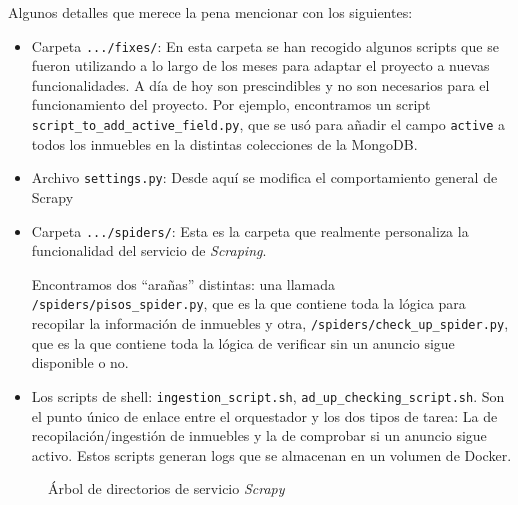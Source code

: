 Algunos detalles que merece la pena mencionar con los siguientes:

\begin{itemize}
    \item Carpeta \texttt{.../fixes/}: En esta carpeta se han recogido algunos scripts que se fueron utilizando a lo largo de los meses para adaptar el proyecto a nuevas funcionalidades. A día de hoy son prescindibles y no son necesarios para el funcionamiento del proyecto. Por ejemplo, encontramos un script \texttt{script\_to\_add\_active\_field.py}, que se usó para añadir el campo \texttt{active} a todos los inmuebles en la distintas colecciones de la MongoDB.
    \item Archivo \texttt{settings.py}: Desde aquí se modifica el comportamiento general de Scrapy
    \item Carpeta \texttt{.../spiders/}: Esta es la carpeta que realmente personaliza la funcionalidad del servicio de \textit{Scraping}. 
    
    Encontramos dos ``arañas'' distintas: una llamada \texttt{/spiders/pisos\_spider.py}, que es la que contiene toda la lógica para recopilar la información de inmuebles y otra,  \texttt{/spiders/check\_up\_spider.py}, que es la que contiene toda la lógica de verificar sin un anuncio sigue disponible o no.
    \item Los scripts de shell: \texttt{ingestion\_script.sh}, \texttt{ad\_up\_checking\_script.sh}. Son el punto único de enlace entre el orquestador y los dos tipos de tarea: La de recopilación/ingestión de inmuebles y la de comprobar si un anuncio sigue activo. Estos scripts generan logs que se almacenan en un volumen de Docker.
\end{itemize}


\begin{figure}
	\caption{Árbol de directorios de servicio \textit{Scrapy}}
	\label{fig:dirtree_scrapy}
\end{figure}

